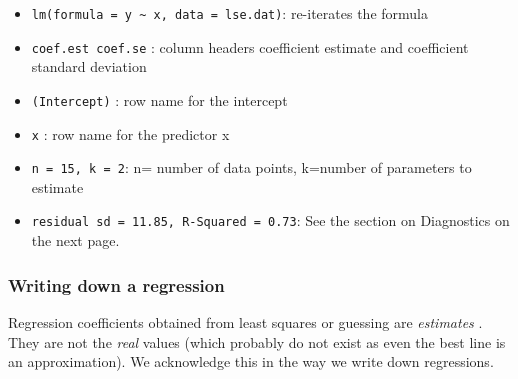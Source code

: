 \documentclass[
]{gitbook}
\providecommand{\tightlist}{%
  \setlength{\itemsep}{0pt}\setlength{\parskip}{0pt}}
\begin{document}
\begin{itemize}
\tightlist
\item
  \texttt{lm(formula\ =\ y\ \textasciitilde{}\ x,\ data\ =\ lse.dat)}: re-iterates the formula
\item
  \texttt{coef.est\ coef.se} : column headers coefficient estimate and coefficient standard deviation
\item
  \texttt{(Intercept)} : row name for the intercept
\item
  \texttt{x} : row name for the predictor x\\
\item
  \texttt{n\ =\ 15,\ k\ =\ 2}: n= number of data points, k=number of parameters to estimate
\item
  \texttt{residual\ sd\ =\ 11.85,\ R-Squared\ =\ 0.73}: See the section on Diagnostics on the next page.
\end{itemize}

\hypertarget{writing-down-a-regression}{%
\subsubsection{Writing down a regression}\label{writing-down-a-regression}}

Regression coefficients obtained from least squares or guessing are \emph{estimates }. They are not the \emph{real} values (which probably do not exist as even the best line is an approximation). We acknowledge this in the way we write down regressions.
\end{document}
